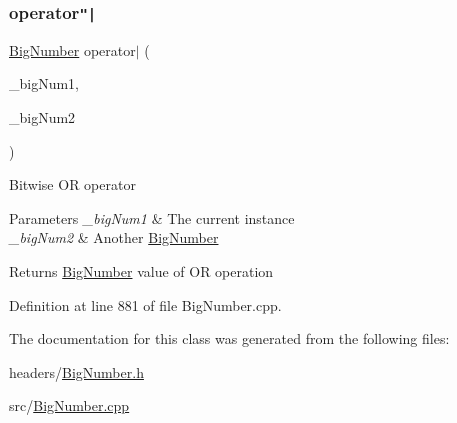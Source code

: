 \subsubsection{\texorpdfstring{operator\texttt{"|}}{operator|}}
{\footnotesize\ttfamily \mbox{\hyperlink{class_big_nums_1_1_big_number}{Big\+Number}} operator$\vert$ (\begin{DoxyParamCaption}\item[{const \mbox{\hyperlink{class_big_nums_1_1_big_number}{Big\+Number}} \&}]{\+\_\+big\+Num1,  }\item[{const \mbox{\hyperlink{class_big_nums_1_1_big_number}{Big\+Number}} \&}]{\+\_\+big\+Num2 }\end{DoxyParamCaption})\hspace{0.3cm}{\ttfamily [friend]}}

Bitwise OR operator 
\begin{DoxyParams}{Parameters}
{\em \+\_\+big\+Num1} & The current instance \\
\hline
{\em \+\_\+big\+Num2} & Another \mbox{\hyperlink{class_big_nums_1_1_big_number}{Big\+Number}} \\
\hline
\end{DoxyParams}
\begin{DoxyReturn}{Returns}
\mbox{\hyperlink{class_big_nums_1_1_big_number}{Big\+Number}} value of OR operation 
\end{DoxyReturn}


Definition at line 881 of file Big\+Number.\+cpp.



The documentation for this class was generated from the following files\+:\begin{DoxyCompactItemize}
\item 
headers/\mbox{\hyperlink{_big_number_8h}{Big\+Number.\+h}}\item 
src/\mbox{\hyperlink{_big_number_8cpp}{Big\+Number.\+cpp}}\end{DoxyCompactItemize}
